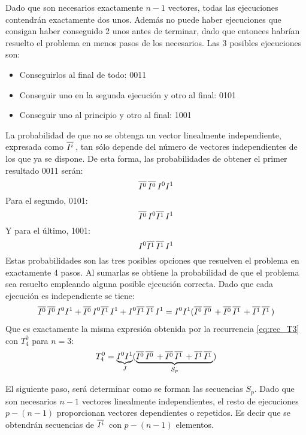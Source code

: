 Dado que son necesarios exactamente $n-1$ vectores, todas las ejecuciones 
contendrán exactamente dos unos.  Además no puede haber ejecuciones que consigan 
haber conseguido 2 unos antes de terminar, dado que entonces habrían resuelto el 
problema en menos pasos de los necesarios.  Las 
3 posibles ejecuciones son:
\begin{itemize}
\item Conseguirlos al final de todo: 0011
\item Conseguir uno en la segunda ejecución y otro al final: 0101
\item Conseguir uno al principio y otro al final: 1001
\end{itemize}
La probabilidad de que no se obtenga un vector linealmente independiente, 
expresada como $\overline{I^{i}}\,$, tan sólo depende del número de vectores independientes 
de los que ya se dispone. De esta forma, las probabilidades de obtener el primer 
resultado 0011 serán:
$$ \overline{I^{0}}\, \overline{I^{0}}\, I^0 I^1 $$
Para el segundo, 0101:
$$ \overline{I^{0}}\, I^0 \overline{I^{1}}\, I^1 $$
Y para el último, 1001:
$$ I^0 \overline{I^{1}}\, \overline{I^{1}}\, I^1 $$
Estas probabilidades son las tres posibles opciones que resuelven el problema en 
exactamente 4 pasos. Al sumarlas se obtiene la probabilidad de que el problema 
sea resuelto empleando alguna posible ejecución correcta. Dado que cada 
ejecución es independiente se tiene:
\begin{equation}
\begin{split}
\overline{I^{0}}\, \overline{I^{0}}\, I^0 I^1 + \overline{I^{0}}\, I^0 \overline{I^{1}}\, I^1 + I^0 \overline{I^{1}}\, \overline{I^{1}}\, I^1 =
I^0I^1(\overline{I^{0}}\, \overline{I^{0}}\, + \overline{I^{0}}\, \overline{I^{1}}\,  + \overline{I^{1}}\, \overline{I^{1}}\, )
\end{split}
\end{equation}
Que es exactamente la misma expresión obtenida por la recurrencia 
\eqref{eq:rec_T3} con $T^0_4$ para $n=3$:
%
$$
	T^0_4 = \underbrace{I^0I^1}_J
	(\underbrace{\overline{I^{0}}\, \overline{I^{0}}\, + \overline{I^{0}}\, \overline{I^{1}}\,  + \overline{I^{1}}\, \overline{I^{1}}\, }_{S_p}) $$
%

El siguiente paso, será determinar como se forman las secuencias $S_p$.
Dado que son necesarios $n-1$ vectores linealmente independientes, el resto de 
ejecuciones $p - (n-1)$ proporcionan vectores dependientes o repetidos. Es decir 
que se obtendrán secuencias de $\overline{I^{i}}\,$ con $p - (n-1)$ elementos.

